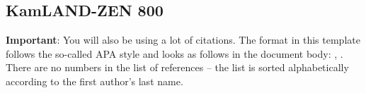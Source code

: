 \subsection{KamLAND-ZEN 800}


{\bf Important}: You will also be using a lot of citations. The format in this template follows the so-called APA style and looks as follows in the document body: \cite{lamport1985:latex}, \cite{Debr01}. There are no numbers in the list of references -- the list is sorted alphabetically according to the first author's last name.


